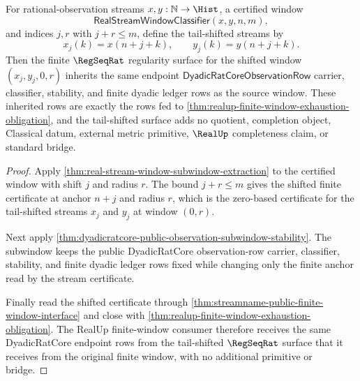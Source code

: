 \begin{theorem}
\label{thm:regseqrat-tail-shift-regularity-stability}
For rational-observation streams $x,y:\mathbb{N}\to\Hist$, a certified window
$$
\mathsf{RealStreamWindowClassifier}(x,y,n,m),
$$
and indices $j,r$ with $j+r\le m$, define the tail-shifted streams by
$$
x_j(k)=x(n+j+k),\qquad y_j(k)=y(n+j+k).
$$
Then the finite $\RegSeqRat$ regularity surface for the shifted window
$(x_j,y_j,0,r)$ inherits the same endpoint
$\mathsf{DyadicRatCoreObservationRow}$ carrier, classifier, stability, and
finite dyadic ledger rows as the source window. These inherited rows are
exactly the rows fed to
\autoref{thm:realup-finite-window-exhaustion-obligation}, and the
tail-shifted surface adds no quotient, completion object, Classical datum,
external metric primitive, $\RealUp$ completeness claim, or standard bridge.
\end{theorem}
\begin{proof}
Apply \autoref{thm:real-stream-window-subwindow-extraction} to the certified
window with shift $j$ and radius $r$. The bound $j+r\le m$ gives the shifted
finite certificate at anchor $n+j$ and radius $r$, which is the zero-based
certificate for the tail-shifted streams $x_j$ and $y_j$ at window $(0,r)$.

Next apply
\autoref{thm:dyadicratcore-public-observation-subwindow-stability}. The
subwindow keeps the public DyadicRatCore observation-row carrier, classifier,
stability, and finite dyadic ledger rows fixed while changing only the finite
anchor read by the stream certificate.

Finally read the shifted certificate through
\autoref{thm:streamname-public-finite-window-interface} and close with
\autoref{thm:realup-finite-window-exhaustion-obligation}. The RealUp
finite-window consumer therefore receives the same DyadicRatCore endpoint rows
from the tail-shifted $\RegSeqRat$ surface that it receives from the original
finite window, with no additional primitive or bridge.
\end{proof}

